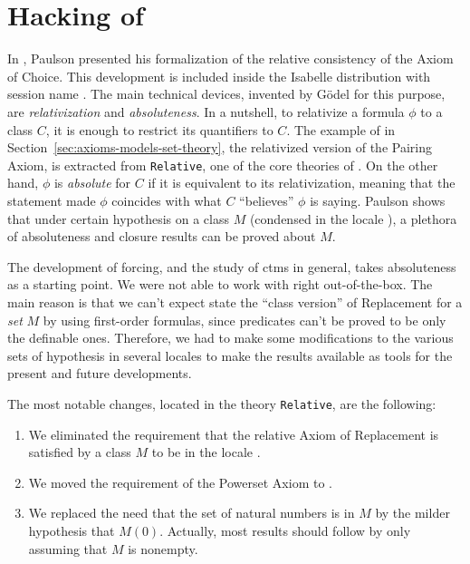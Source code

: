 \section{Hacking of }
\label{sec:hack-constructible}
In \cite{paulson_2003}, Paulson presented his formalization of the
relative consistency of the Axiom of Choice. This development is
included inside the Isabelle distribution with session name
. The main technical devices, invented by
G\"odel for this purpose, are \emph{relativization} and
\emph{absoluteness}. In a nutshell, to relativize a formula $\phi$ to
a class $C$, it is enough to restrict its quantifiers to $C$. The
example of  in
Section~\ref{sec:axioms-models-set-theory}, the relativized version of
the Pairing Axiom, is extracted from \texttt{Relative}, one of the
core theories of . On the other hand, $\phi$
is \emph{absolute} for $C$ if it is equivalent to its relativization,
meaning that the statement made $\phi$ coincides with what $C$
``believes'' $\phi$ is saying. Paulson shows that under certain
hypothesis  on a class $M$ (condensed in the locale ), a plethora of
absoluteness and closure results can be proved about $M$.

The development of forcing, and the study of ctms in general, takes
absoluteness as a starting point. We were not able to work with
 right out-of-the-box. The main reason is that
we can't expect state the ``class version'' of Replacement for a
\emph{set} $M$ by
using first-order formulas, since predicates  can't
be proved to be only the definable ones. Therefore, we had to make
some modifications to the various sets of hypothesis in several
locales to make the results available as tools for the present and
future developments.


The most notable changes, located in the theory \texttt{Relative}, are
the following:
\begin{enumerate}
\item\label{item:1} We eliminated the requirement that the relative Axiom of Replacement
  is satisfied by a class $M$ to be in the locale . 
\item\label{item:2} We moved the requirement of the Powerset Axiom to . 
\item\label{item:3} We replaced the need that the set of natural numbers is in $M$ by the
  milder hypothesis that $M(0)$. Actually, most results should follow
  by only assuming that $M$ is nonempty.
\end{enumerate}

